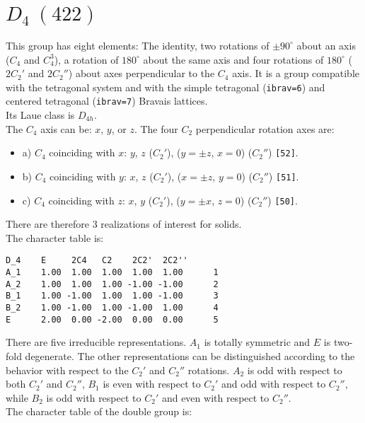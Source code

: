 \documentclass[12pt,a4paper,twoside]{report}
\begin{document}
\newpage
{\color{coral}\section{$D_4\ (422)$}} 
\color{black}
This group has eight elements: The identity, two rotations of 
$\pm90^\circ$ about
an axis ($C_4$ and $C_4^3$), a rotation of $180^\circ$ about the same axis and
four rotations of $180^\circ$ ($2C_2'$ and $2C_2''$) about axes perpendicular 
to the $C_4$ axis. It is a group compatible with the tetragonal system and with the
simple tetragonal (\texttt{ibrav=6}) and centered tetragonal (\texttt{ibrav=7})
Bravais lattices. \\ 
Its Laue class is $D_{4h}$. \\
The $C_4$ axis can be: $x$, $y$, or $z$. The four $C_2$ perpendicular rotation
axes are: 
\begin{itemize}
\item
a) $C_4$ coinciding with $x$: $y$, $z$ ($C_2'$), ($y=\pm z$, $x=0$) ($C_2''$)
\texttt{[52]}.
\item
b) $C_4$ coinciding with $y$: $x$, $z$ ($C_2'$), ($x=\pm z$, $y=0$) ($C_2''$)
\texttt{[51]}.
\item
c) $C_4$ coinciding with $z$: $x$, $y$ ($C_2'$), ($y=\pm x$, $z=0$) ($C_2''$)
\texttt{[50]}.
\end{itemize}
There are therefore $3$ realizations of interest for solids. \\
The character table is:

\begin{tcolorbox}
\begin{footnotesize}
\begin{verbatim}
D_4    E     2C4   C2    2C2'  2C2''
A_1    1.00  1.00  1.00  1.00  1.00      1
A_2    1.00  1.00  1.00 -1.00 -1.00      2
B_1    1.00 -1.00  1.00  1.00 -1.00      3
B_2    1.00 -1.00  1.00 -1.00  1.00      4
E      2.00  0.00 -2.00  0.00  0.00      5
\end{verbatim}
\end{footnotesize}
\end{tcolorbox}

There are five irreducible representations. $A_1$ is totally symmetric 
and $E$ is two-fold degenerate. The other representations can be distinguished
according to the behavior with respect to the $C_2'$ and $C_2''$ rotations.
$A_2$ is odd with respect to both $C_2'$ and $C_2''$, $B_1$ is even with respect
to $C_2'$ and odd with respect to $C_2''$, while $B_2$ is odd with respect to
$C_2'$ and even with respect to $C_2''$. \\ 
The character table of the double group is:
\end{document}
